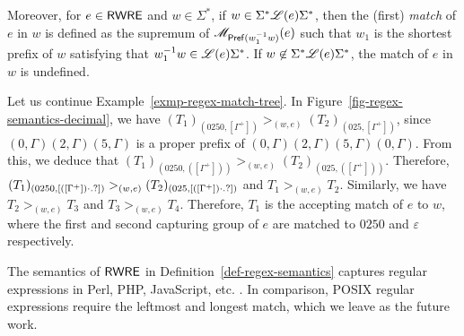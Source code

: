 \begin{definition}
  	 Moreover,  for $e \in {\sf RWRE}$ and $w \in \Sigma^\ast$, if $w \in \Sigma^\ast \mathscr{L}(e)\Sigma^\ast$, then the (first) \emph{match} of $e$ in $w$ is defined as the supremum of $\mathscr{M}_{\mathsf{Pref}(w_1^{-1}w)}(e)$ such that $w_1$ is the shortest prefix of $w$ satisfying that $w_1^{-1}w \in \mathscr{L}(e)\Sigma^\ast$. If $w \not \in \Sigma^\ast \mathscr{L}(e)\Sigma^\ast$, the match of $e$ in $w$ is undefined.  
%  	
  \end{definition}

\begin{example}\label{exmp-regex-semantics}
Let us continue Example~\ref{exmp-regex-match-tree}.  In Figure~\ref{fig-regex-semantics-decimal}, we have $(T_1)_{(0250, [\Gamma^+])} >_{(w, e)} (T_2)_{(025, [\Gamma^+])}$, since $(0, \Gamma)(2, \Gamma)(5,\Gamma)$ is a proper prefix of $(0, \Gamma)(2, \Gamma)(5,\Gamma)(0, \Gamma)$. From this, we deduce that $(T_1)_{(0250, ([\Gamma^+]))} >_{(w, e)} (T_2)_{(025, ([\Gamma^+]))}$. Therefore, $(T_1)_{(0250, [([\Gamma^+]) \cdot .?])} >_{(w, e)} (T_2)_{(025,  [([\Gamma^+]) \cdot .?])}$ and $T_1 >_{(w,e)} T_2$. Similarly, we have $T_2 >_{(w,e)} T_3$ and $T_3 >_{(w,e)} T_4$. Therefore, $T_1$ is the accepting match of $e$ to $w$, where the first and second capturing group of $e$ are matched to $0250$  and $\varepsilon$ respectively. 
 \end{example}
  
\begin{remark}
The semantics of ${\sf RWRE}$ in Definition~\ref{def-regex-semantics} captures regular expressions in Perl, PHP, JavaScript, etc. \cite{MasterREbook}. In comparison, POSIX regular expressions require the leftmost and longest match, which we leave as the future work. 
\end{remark}
  
  
  
%  
